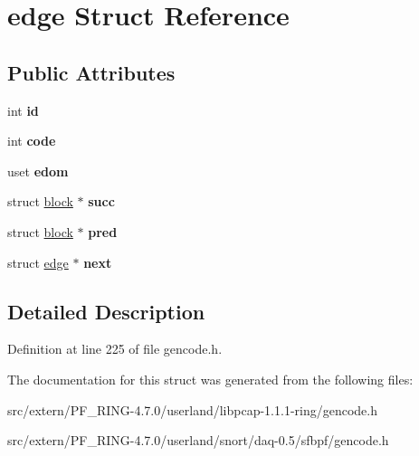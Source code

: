 \hypertarget{structedge}{
\section{edge Struct Reference}
\label{structedge}
}
\subsection*{Public Attributes}
\begin{DoxyCompactItemize}
\item 
\hypertarget{structedge_a64bbff727caf35c372648e9de602a549}{
int {\bfseries id}}
\label{structedge_a64bbff727caf35c372648e9de602a549}

\item 
\hypertarget{structedge_a691232e2dfbfeaca6ec4ea3338d64f76}{
int {\bfseries code}}
\label{structedge_a691232e2dfbfeaca6ec4ea3338d64f76}

\item 
\hypertarget{structedge_a453b8d3131d17321ba04ae2228c205b4}{
uset {\bfseries edom}}
\label{structedge_a453b8d3131d17321ba04ae2228c205b4}

\item 
\hypertarget{structedge_aa299cbe7d4c85a368cf91c752ce92b1f}{
struct \hyperlink{structblock}{block} $\ast$ {\bfseries succ}}
\label{structedge_aa299cbe7d4c85a368cf91c752ce92b1f}

\item 
\hypertarget{structedge_a9093cfd42fcfb106b43982b532dbdab2}{
struct \hyperlink{structblock}{block} $\ast$ {\bfseries pred}}
\label{structedge_a9093cfd42fcfb106b43982b532dbdab2}

\item 
\hypertarget{structedge_af803bee9cc8bb3acf0bc5b67594e2960}{
struct \hyperlink{structedge}{edge} $\ast$ {\bfseries next}}
\label{structedge_af803bee9cc8bb3acf0bc5b67594e2960}

\end{DoxyCompactItemize}


\subsection{Detailed Description}


Definition at line 225 of file gencode.h.



The documentation for this struct was generated from the following files:\begin{DoxyCompactItemize}
\item 
src/extern/PF\_\-RING-\/4.7.0/userland/libpcap-\/1.1.1-\/ring/gencode.h\item 
src/extern/PF\_\-RING-\/4.7.0/userland/snort/daq-\/0.5/sfbpf/gencode.h\end{DoxyCompactItemize}
